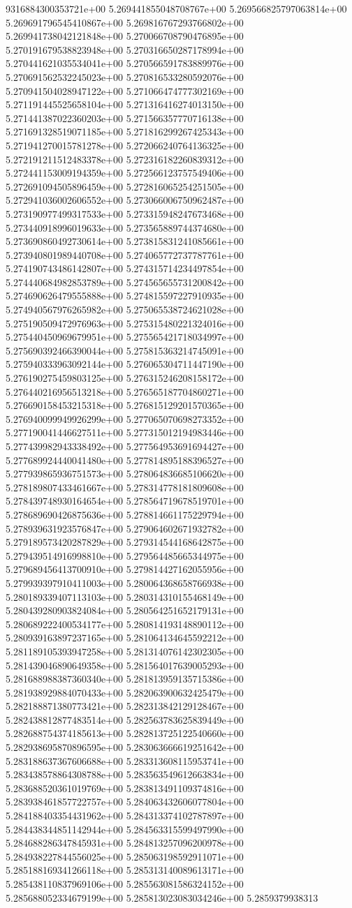 9316884300353721e+00	5.269441855048708767e+00	5.269566825797063814e+00	5.269691796545410867e+00	5.269816767293766802e+00	5.269941738042121848e+00	5.270066708790476895e+00	5.270191679538823948e+00	5.270316650287178994e+00	5.270441621035534041e+00	5.270566591783889976e+00	5.270691562532245023e+00	5.270816533280592076e+00	5.270941504028947122e+00	5.271066474777302169e+00	5.271191445525658104e+00	5.271316416274013150e+00	5.271441387022360203e+00	5.271566357770716138e+00	5.271691328519071185e+00	5.271816299267425343e+00	5.271941270015781278e+00	5.272066240764136325e+00	5.272191211512483378e+00	5.272316182260839312e+00	5.272441153009194359e+00	5.272566123757549406e+00	5.272691094505896459e+00	5.272816065254251505e+00	5.272941036002606552e+00	5.273066006750962487e+00	5.273190977499317533e+00	5.273315948247673468e+00	5.273440918996019633e+00	5.273565889744374680e+00	5.273690860492730614e+00	5.273815831241085661e+00	5.273940801989440708e+00	5.274065772737787761e+00	5.274190743486142807e+00	5.274315714234497854e+00	5.274440684982853789e+00	5.274565655731200842e+00	5.274690626479555888e+00	5.274815597227910935e+00	5.274940567976265982e+00	5.275065538724621028e+00	5.275190509472976963e+00	5.275315480221324016e+00	5.275440450969679951e+00	5.275565421718034997e+00	5.275690392466390044e+00	5.275815363214745091e+00	5.275940333963092144e+00	5.276065304711447190e+00	5.276190275459803125e+00	5.276315246208158172e+00	5.276440216956513218e+00	5.276565187704860271e+00	5.276690158453215318e+00	5.276815129201570365e+00	5.276940099949926299e+00	5.277065070698273352e+00	5.277190041446627511e+00	5.277315012194983446e+00	5.277439982943338492e+00	5.277564953691694427e+00	5.277689924440041480e+00	5.277814895188396527e+00	5.277939865936751573e+00	5.278064836685106620e+00	5.278189807433461667e+00	5.278314778181809608e+00	5.278439748930164654e+00	5.278564719678519701e+00	5.278689690426875636e+00	5.278814661175229794e+00	5.278939631923576847e+00	5.279064602671932782e+00	5.279189573420287829e+00	5.279314544168642875e+00	5.279439514916998810e+00	5.279564485665344975e+00	5.279689456413700910e+00	5.279814427162055956e+00	5.279939397910411003e+00	5.280064368658766938e+00	5.280189339407113103e+00	5.280314310155468149e+00	5.280439280903824084e+00	5.280564251652179131e+00	5.280689222400534177e+00	5.280814193148890112e+00	5.280939163897237165e+00	5.281064134645592212e+00	5.281189105393947258e+00	5.281314076142302305e+00	5.281439046890649358e+00	5.281564017639005293e+00	5.281688988387360340e+00	5.281813959135715386e+00	5.281938929884070433e+00	5.282063900632425479e+00	5.282188871380773421e+00	5.282313842129128467e+00	5.282438812877483514e+00	5.282563783625839449e+00	5.282688754374185613e+00	5.282813725122540660e+00	5.282938695870896595e+00	5.283063666619251642e+00	5.283188637367606688e+00	5.283313608115953741e+00	5.283438578864308788e+00	5.283563549612663834e+00	5.283688520361019769e+00	5.283813491109374816e+00	5.283938461857722757e+00	5.284063432606077804e+00	5.284188403354431962e+00	5.284313374102787897e+00	5.284438344851142944e+00	5.284563315599497990e+00	5.284688286347845931e+00	5.284813257096200978e+00	5.284938227844556025e+00	5.285063198592911071e+00	5.285188169341266118e+00	5.285313140089613171e+00	5.285438110837969106e+00	5.285563081586324152e+00	5.285688052334679199e+00	5.285813023083034246e+00	5.2859379938313